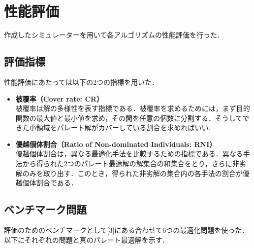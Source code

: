 \documentclass[a4paper, twocolumn]{ltjsarticle}
\begin{document}
\section{性能評価}
作成したシミュレーターを用いて各アルゴリズムの性能評価を行った．
\subsection{評価指標}
性能評価にあたっては以下の2つの指標を用いた．
\begin{itemize}
    \item \textbf{被覆率（Cover rate: CR）}\\\quad
        被覆率は解の多様性を表す指標である．被覆率を求めるためには，まず目的関数の最大値と最小値を求め，その間を任意の個数に分割する．そうしてできた小領域をパレート解がカバーしている割合を求めればいい.
    \item \textbf{優越個体割合（Ratio of Non-dominated Individuals: RNI）}\\\quad
        優越個体割合は，異なる最適化手法を比較するための指標である．異なる手法から得られた2つのパレート最適解の解集合の和集合をとり，さらに非劣解のみを取り出す．このとき，得られた非劣解の集合内の各手法の割合が優越個体割合である．
\end{itemize}
\subsection{ベンチマーク問題}
評価のためのベンチマークとして[3]にある合わせて6つの最適化問題を使った．以下にそれぞれの問題と真のパレート最適解を示す．
\vspace{10pt}
\end{document}

